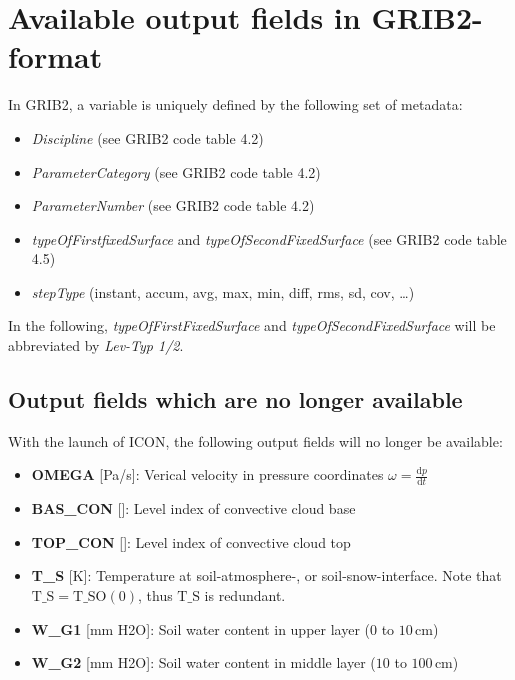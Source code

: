 \chapter{Available output fields in GRIB2-format}

\newcommand{\rb}[1]{\raisebox{4.0ex}[0pt]{#1}}

In GRIB2, a variable is uniquely defined by the following set of metadata:
\begin{itemize}
 \item \emph{Discipline} (see GRIB2 code table 4.2)
 \item \emph{ParameterCategory} (see GRIB2 code table 4.2)
 \item \emph{ParameterNumber} (see GRIB2 code table 4.2)
 \item \emph{typeOfFirstfixedSurface} and \emph{typeOfSecondFixedSurface} (see GRIB2 code table 4.5)
 \item \emph{stepType} (instant, accum, avg, max, min, diff, rms, sd, cov, \dots)
\end{itemize}
In the following, \emph{typeOfFirstFixedSurface} and \emph{typeOfSecondFixedSurface} will be abbreviated by \emph{Lev-Typ 1/2}.

\section{Output fields which are no longer available}
With the launch of ICON, the following output fields will no longer be available:

\begin{itemize}
 \item \textbf{OMEGA} [Pa/s]: Verical velocity in pressure coordinates $\omega=\frac{\mathrm{d}p}{\mathrm{d}t}$
 \item \textbf{BAS\_CON} [\textendash]: Level index of convective cloud base
 \item \textbf{TOP\_CON} [\textendash]: Level index of convective cloud top
 \item \textbf{T\_S} [K]: Temperature at soil-atmosphere-, or soil-snow-interface. Note that $\mathrm{T\_S} = \mathrm{T\_SO(0)}$, thus $\mathrm{T\_S}$ is redundant.
 \item \textbf{W\_G1} [mm H2O]: Soil water content in upper layer ($0$ to $10\,\mathrm{cm}$) 
 \item \textbf{W\_G2} [mm H2O]: Soil water content in middle layer ($10$ to $100\,\mathrm{cm}$)
\end{itemize}


